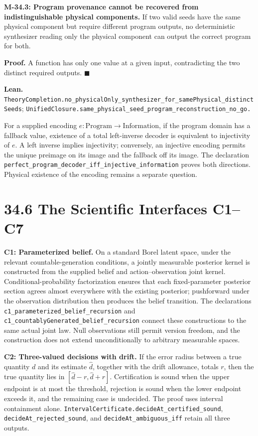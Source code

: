 \documentclass[
  english,
  11pt,
  oneside]{book}
\begin{document}
\hypertarget{m-34-3}{}\label{m-34-3}

\textbf{M-34.3: Program provenance cannot be recovered from indistinguishable physical components.} If two valid seeds have the same physical component but require different program outputs, no deterministic synthesizer reading only the physical component can output the correct program for both.

\textbf{Proof.} A function has only one value at a given input, contradicting the two distinct required outputs. \(\blacksquare\)

\textbf{Lean.} \nolinkurl{TheoryCompletion.no_physicalOnly_synthesizer_for_samePhysical_distinctSeeds}; \nolinkurl{UnifiedClosure.same_physical_seed_program_reconstruction_no_go.}

For a supplied encoding \(e:\mathrm{Program}\to\mathrm{Information}\), if the program domain has a fallback value, existence of a total left-inverse decoder is equivalent to injectivity of \(e\). A left inverse implies injectivity; conversely, an injective encoding permits the unique preimage on its image and the fallback off its image. The declaration \nolinkurl{perfect_program_decoder_iff_injective_information} proves both directions. Physical existence of the encoding remains a separate question.

\section{34.6 The Scientific Interfaces C1--C7}\label{the-scientific-interfaces-c1c7}

\textbf{C1: Parameterized belief.} On a standard Borel latent space, under the relevant countable-generation conditions, a jointly measurable posterior kernel is constructed from the supplied belief and action--observation joint kernel. Conditional-probability factorization ensures that each fixed-parameter posterior section agrees almost everywhere with the existing posterior; pushforward under the observation distribution then produces the belief transition. The declarations \nolinkurl{c1_parameterized_belief_recursion} and \nolinkurl{c1_countablyGenerated_belief_recursion} connect these constructions to the same actual joint law. Null observations still permit version freedom, and the construction does not extend unconditionally to arbitrary measurable spaces.

\textbf{C2: Three-valued decisions with drift.} If the error radius between a true quantity \(d\) and its estimate \(\widehat d\), together with the drift allowance, totals \(r\), then the true quantity lies in \([\widehat d-r,\widehat d+r]\). Certification is sound when the upper endpoint is at most the threshold, rejection is sound when the lower endpoint exceeds it, and the remaining case is undecided. The proof uses interval containment alone. \nolinkurl{IntervalCertificate.decideAt_certified_sound}, \nolinkurl{decideAt_rejected_sound}, and \nolinkurl{decideAt_ambiguous_iff} retain all three outputs.
\end{document}
